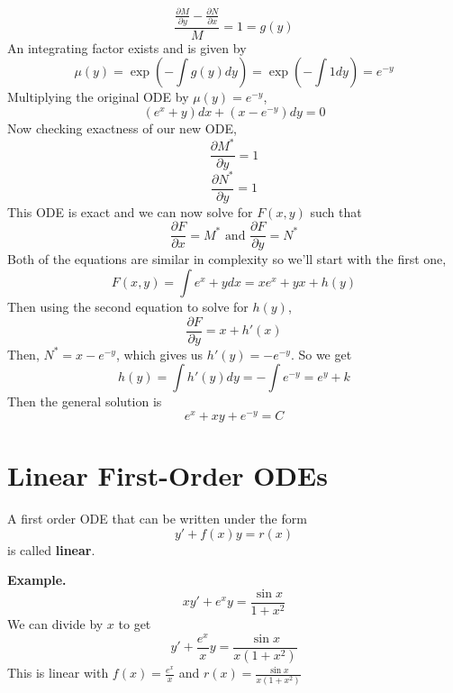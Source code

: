 \documentclass[openany]{report}
\begin{document}
\[\frac{\frac{\partial M}{\partial y} - \frac{\partial N}{\partial x}}{M} = 1 = g(y)\]
An integrating factor exists and is given by
\[\mu(y) = \exp\left(-\int g(y)dy\right) = \exp\left(-\int 1 dy\right) = e^{-y}\]
Multiplying the original ODE by $\mu(y) = e^{-y}$,
\[(e^x + y)dx + (x - e^{-y})dy = 0\]
Now checking exactness of our new ODE,
\[\frac{\partial M^*}{\partial y} = 1\]
\[\frac{\partial N^*}{\partial y} = 1\]
This ODE is exact and we can now solve for $F(x,y)$ such that
\[\frac{\partial F}{\partial x} = M^* \text{ and } \frac{\partial F}{\partial y} = N^*\]
Both of the equations are similar in complexity so we'll start with the first one,
\[F(x,y) = \int e^x + y dx = xe^x + yx + h(y)\]
Then using the second equation to solve for $h(y)$,
\[\frac{\partial F}{\partial y} = x + h'(x)\]
Then, $N^* = x - e^{-y}$, which gives us $h'(y) = -e^{-y}$. So we get
\[h(y) = \int h'(y)dy = -\int e^{-y} = e^y + k\]
Then the general solution is 
\[e^x + xy + e^{-y} = C\]
\section{Linear First-Order ODEs}
\begin{definition}
    A first order ODE that can be written under the form 
    \[y' + f(x)y = r(x)\]
    is called \textbf{linear}.
\end{definition}
\noindent
\textbf{Example.} 
\[xy' + e^xy = \frac{\sin x}{1 + x^2}\]
We can divide by $x$ to get
\[y' + \frac{e^x}{x}y = \frac{\sin x}{x(1+x^2)}\]
This is linear with $f(x) = \frac{e^x}{x}$ and $r(x) = \frac{\sin x}{x(1+x^2)}$
\end{document}
